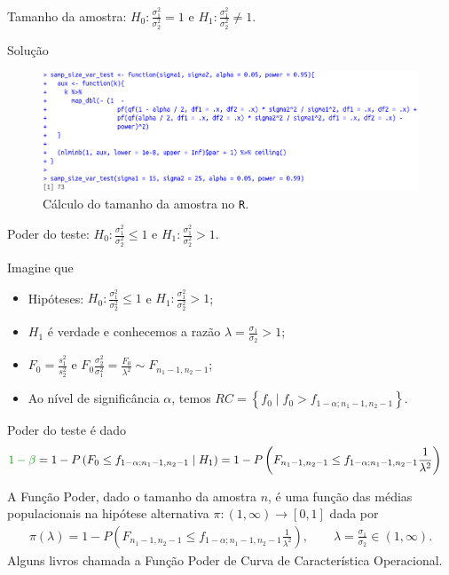\documentclass[9pt]{beamer}
\begin{document}
\begin{frame}{Tamanho da amostra: $H_0:\frac{\sigma_1^2}{\sigma_2^2} = 1$ e $H_1:\frac{\sigma_1^2}{\sigma_2^2} \neq 1$.}

\normalsize

\begin{block}{Solução}
	\begin{figure}[htbp]
		\centering
		\includegraphics[width=\linewidth]{figures/samp-size-test-var-bilateral}
		\caption{Cálculo do tamanho da amostra no \texttt{R}.}
	\end{figure}

\end{block}
\end{frame}

\begin{frame}{Poder do teste: $H_0:\frac{\sigma_1^2}{\sigma_2^2} \leq 1$ e $H_1:\frac{\sigma_1^2}{\sigma_2^2} > 1$.}

\normalsize

Imagine que
\begin{itemize}
	\item Hipóteses: $H_0:\frac{\sigma_1^2}{\sigma_2^2} \leq 1$ e $H_1:\frac{\sigma_1^2}{\sigma_2^2} > 1$;
	\item $H_1$ é verdade e conhecemos a razão $\lambda=\frac{\sigma_1}{\sigma_2} > 1$;
	\item $F_0 = \frac{s_1^2}{s_2^2}$ e $F_0 \frac{\sigma_2^2}{\sigma_1^2} = \frac{F_0}{\lambda^2} \sim F_{n_1-1, n_2-1}$;
	\item Ao nível de significância $\alpha$, temos $RC = \left\{ f_0 \mid f_0 > f_{1-\alpha; n_1-1, n_2-1} \right\}$.
\end{itemize}
\vfill	

Poder do teste é dado
\begin{align*}
\textcolor{important}{1-\beta} &=1 - P\left( F_0 \leq f_{1-\alpha; n_1-1, n_2-1} \mid H_1\right)= 1 - P \left(F_{n_1-1, n_2-1} \leq f_{1-\alpha; n_1-1, n_2-1} \frac{1}{\lambda^2} \right)
\end{align*}
\vfill

A \textcolor{important}{Função Poder}, dado o tamanho da amostra $n$, é uma função das médias populacionais na hipótese alternativa  $\pi: (1,\infty) \longrightarrow [0,1]$ dada por
\begin{align*}
\pi(\lambda) = 1 - P \left(F_{n_1-1, n_2-1} \leq f_{1-\alpha; n_1-1, n_2-1} \frac{1}{\lambda^2} \right), \qquad \lambda = \frac{\sigma_1}{\sigma_2} \in (1, \infty).
\end{align*}
Alguns livros chamada a Função Poder de \textcolor{important}{Curva de Característica Operacional.}

\normalsize
\end{frame}
\end{document}
